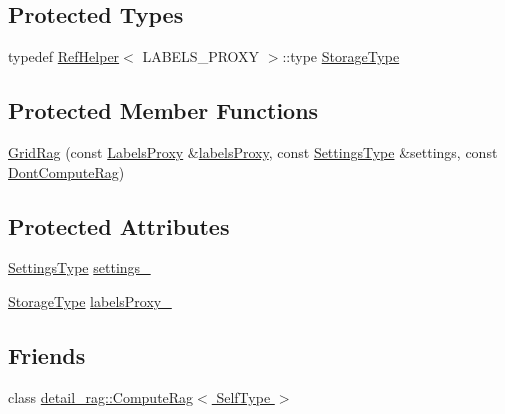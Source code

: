 \subsection*{Protected Types}
\begin{DoxyCompactItemize}
\item 
typedef \hyperlink{structnifty_1_1graph_1_1RefHelper}{Ref\+Helper}$<$ L\+A\+B\+E\+L\+S\+\_\+\+P\+R\+O\+XY $>$\+::type \hyperlink{classnifty_1_1graph_1_1GridRag_ae7dcf657b20ef49d062648978e192cdb}{Storage\+Type}
\end{DoxyCompactItemize}
\subsection*{Protected Member Functions}
\begin{DoxyCompactItemize}
\item 
\hyperlink{classnifty_1_1graph_1_1GridRag_a559717d346c6e2e626994c1018fc5761}{Grid\+Rag} (const \hyperlink{classnifty_1_1graph_1_1GridRag_ad3146f72301da4f45b51e3b692776cf1}{Labels\+Proxy} \&\hyperlink{classnifty_1_1graph_1_1GridRag_a8589e44e41c12e7956d7d25a644c238e}{labels\+Proxy}, const \hyperlink{structnifty_1_1graph_1_1GridRag_1_1SettingsType}{Settings\+Type} \&settings, const \hyperlink{structnifty_1_1graph_1_1GridRag_1_1DontComputeRag}{Dont\+Compute\+Rag})
\end{DoxyCompactItemize}
\subsection*{Protected Attributes}
\begin{DoxyCompactItemize}
\item 
\hyperlink{structnifty_1_1graph_1_1GridRag_1_1SettingsType}{Settings\+Type} \hyperlink{classnifty_1_1graph_1_1GridRag_af4610f430b2ed52e5a4ea54c1eddcaf1}{settings\+\_\+}
\item 
\hyperlink{classnifty_1_1graph_1_1GridRag_ae7dcf657b20ef49d062648978e192cdb}{Storage\+Type} \hyperlink{classnifty_1_1graph_1_1GridRag_abaacb5cd2582a08e27ec4af04f5e9881}{labels\+Proxy\+\_\+}
\end{DoxyCompactItemize}
\subsection*{Friends}
\begin{DoxyCompactItemize}
\item 
class \hyperlink{classnifty_1_1graph_1_1GridRag_abafcbd3543961eb6e4ee794aa6a62d66}{detail\+\_\+rag\+::\+Compute\+Rag$<$ Self\+Type $>$}
\end{DoxyCompactItemize}


